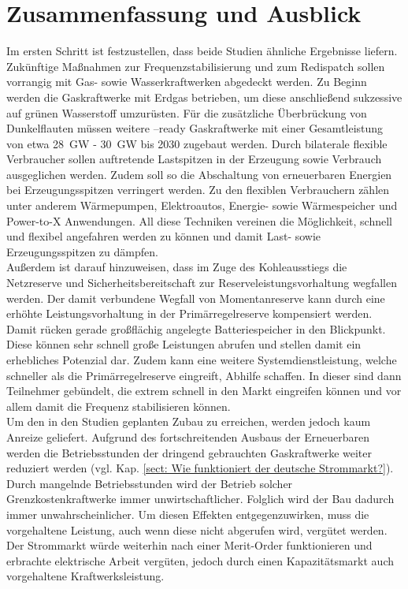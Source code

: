 \section{Zusammenfassung und Ausblick}

	Im ersten Schritt ist festzustellen, dass beide Studien ähnliche Ergebnisse liefern.
	Zukünftige Maßnahmen zur Frequenzstabilisierung und zum Redispatch sollen vorrangig mit Gas- sowie Wasserkraftwerken abgedeckt werden.
	Zu Beginn werden die Gaskraftwerke mit Erdgas betrieben, um diese anschließend sukzessive auf grünen Wasserstoff umzurüsten.
	Für die zusätzliche Überbrückung von Dunkelflauten müssen weitere \Htwo--ready Gaskraftwerke mit einer Gesamtleistung von etwa \SI{28}{\giga\watt} - \SI{30}{\giga\watt} bis 2030 zugebaut werden.
	Durch bilaterale flexible Verbraucher sollen auftretende Lastspitzen in der Erzeugung sowie Verbrauch ausgeglichen werden.
	Zudem soll so die Abschaltung von erneuerbaren Energien bei Erzeugungsspitzen verringert werden.
	Zu den flexiblen Verbrauchern zählen unter anderem Wärmepumpen, Elektroautos, Energie- sowie Wärmespeicher und Power-to-X Anwendungen.
	All diese Techniken vereinen die Möglichkeit, schnell und flexibel angefahren werden zu können und damit Last- sowie Erzeugungsspitzen zu dämpfen. \\
	
	Außerdem ist darauf hinzuweisen, dass im Zuge des Kohleausstiegs die Netzreserve und Sicherheitsbereitschaft zur Reserveleistungsvorhaltung wegfallen werden.
	Der damit verbundene Wegfall von Momentanreserve kann durch eine erhöhte Leistungsvorhaltung in der Primärregelreserve kompensiert werden.
	Damit rücken gerade großflächig angelegte Batteriespeicher in den Blickpunkt.
	Diese können sehr schnell große Leistungen abrufen und stellen damit ein erhebliches Potenzial dar. 
	Zudem kann eine weitere Systemdienstleistung, welche schneller als die Primärregelreserve eingreift, Abhilfe  schaffen.
	In dieser sind dann Teilnehmer gebündelt, die extrem schnell in den Markt eingreifen können und vor allem damit die Frequenz stabilisieren können. \\
	
	Um den in den Studien geplanten Zubau zu erreichen, werden jedoch kaum Anreize geliefert.
	Aufgrund des fortschreitenden Ausbaus der Erneuerbaren werden die Betriebsstunden der dringend gebrauchten Gaskraftwerke weiter reduziert werden (vgl. Kap. \ref{sect: Wie funktioniert der deutsche Strommarkt?}).
	Durch mangelnde Betriebsstunden wird der Betrieb solcher Grenzkostenkraftwerke immer unwirtschaftlicher.
	Folglich wird der Bau dadurch immer unwahrscheinlicher.
	Um diesen Effekten entgegenzuwirken, muss die vorgehaltene Leistung, auch wenn diese nicht abgerufen wird, vergütet werden.
	Der Strommarkt würde weiterhin nach einer Merit-Order funktionieren und erbrachte elektrische Arbeit vergüten, jedoch durch einen Kapazitätsmarkt auch vorgehaltene Kraftwerksleistung. \\
	
